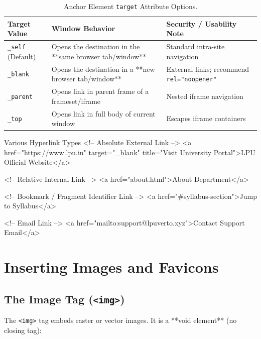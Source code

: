 \begin{table}[htbp]
\centering
\small
\renewcommand{\arraystretch}{1.3}
\begin{tabularx}{\linewidth}{ll>{\raggedright\arraybackslash}X}
\toprule
\textbf{Target Value} & \textbf{Window Behavior} & \textbf{Security / Usability Note} \\
\midrule
\texttt{\_self} (Default) & Opens the destination in the **same browser tab/window** & Standard intra-site navigation \\
\texttt{\_blank} & Opens the destination in a **new browser tab/window** & External links; recommend \texttt{rel="noopener"} \\
\texttt{\_parent} & Opens link in parent frame of a frameset/iframe & Nested iframe navigation \\
\texttt{\_top} & Opens link in full body of current window & Escapes iframe containers \\
\bottomrule
\end{tabularx}
\caption{Anchor Element \texttt{target} Attribute Options.}
\label{tab:anchor-targets}
\end{table}

\begin{htmlcode}{Various Hyperlink Types}
<!-- Absolute External Link -->
<a href="https://www.lpu.in" target="_blank" title="Visit University Portal">LPU Official Website</a>

<!-- Relative Internal Link -->
<a href="about.html">About Department</a>

<!-- Bookmark / Fragment Identifier Link -->
<a href="#syllabus-section">Jump to Syllabus</a>

<!-- Email Link -->
<a href="mailto:support@lpuverto.xyz">Contact Support Email</a>
\end{htmlcode}

\section{Inserting Images and Favicons}

\subsection{The Image Tag (\texttt{<img>})}
The \texttt{<img>} tag embeds raster or vector images. It is a **void element** (no closing tag):

